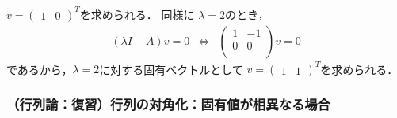 $v = (\begin{array}{cc}1 & 0\end{array})^T$を求められる．
同様に
$\lambda = 2$のとき，
\begin{equation}
 \begin{array}{ccc}
 (\lambda I - A) v = 0
 &\Leftrightarrow&
 \left(
 \begin{array}{cc}
  1 & -1 \\
  0 & 0 \\
 \end{array}
 \right) v = 0 
 \end{array}
\end{equation}
であるから，$\lambda = 2$に対する固有ベクトルとして
$v = (\begin{array}{cc}1 & 1\end{array})^T$を求められる．


\subsubsection{（行列論：復習）行列の対角化：固有値が相異なる場合}

